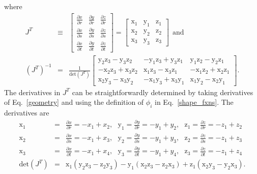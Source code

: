 %
where
%
\begin{eqnarray}
J^T &\equiv&
% 
\begin{bmatrix}
\frac{\partial x}{\partial r} & \frac{\partial y}{\partial r} & \frac{\partial z}{\partial r} \\
\frac{\partial x}{\partial s} & \frac{\partial y}{\partial s} & \frac{\partial z}{\partial s} \\
\frac{\partial x}{\partial t} & \frac{\partial y}{\partial t} & \frac{\partial z}{\partial t} 
\end{bmatrix} 
%
=
%
\begin{bmatrix}
\text{x}_1 & \text{y}_1 & \text{z}_1 \\
\text{x}_2 & \text{y}_2 & \text{z}_2 \\
\text{x}_3 & \text{y}_3 & \text{z}_3
\end{bmatrix} \ \ \text{and} \nonumber\\
%
(J^T)^{-1} &=& \frac{1}{\text{det}(J^T)} \begin{bmatrix}
\text{y}_2 \text{z}_3 - \text{y}_3 \text{z}_2 &-\text{y}_1 \text{z}_3 + \text{y}_3 \text{z}_1  & \text{y}_1 \text{z}_2 - \text{y}_2 \text{z}_1 \\
- \text{x}_2 \text{z}_3 + \text{x}_3\text{z}_2 & \text{x}_1\text{z}_3 - \text{x}_3 \text{z}_1 & -\text{x}_1 \text{z}_2 + \text{x}_2 \text{z}_1  \\
\text{x}_2 \text{y}_3 - \text{x}_3 \text{y}_2 & -\text{x}_1 \text{y}_3 + \text{x}_3 \text{y}_1 & \text{x}_1 \text{y}_2 - \text{x}_2 \text{y}_1
\end{bmatrix}.
\label{J}
\end{eqnarray}
%
The derivatives in $J^T$ can be straightforwardly determined by taking derivatives of Eq.\ \eqref{geometry} and using the definition of $\phi_i$ in Eq.\ \eqref{shape_fxns}. The derivatives are
%
\begin{eqnarray}
\text{x}_1 &=& \frac{\partial x}{\partial r} = -x_1 + x_2 , \ \ \
\text{y}_1 = \frac{\partial y}{\partial r} = -y_1 + y_2 , \ \ \
\text{z}_1 = \frac{\partial z}{\partial r} = -z_1 + z_2 \nonumber\\
%
\text{x}_2 &=& \frac{\partial x}{\partial s} = -x_1 + x_3 , \ \ \
\text{y}_2 = \frac{\partial y}{\partial s} = -y_1 + y_3, \ \ \  
\text{z}_2 = \frac{\partial z}{\partial s} = -z_1 + z_3 \nonumber\\
%
\text{x}_3 &=& \frac{\partial x}{\partial t} = - x_1 + x_4, \ \ \ 
\text{y}_3 = \frac{\partial y}{\partial t} = - y_1 + y_4, \ \ \ 
\text{z}_3 = \frac{\partial z}{\partial t} = -z_1 + z_4  \nonumber\\
%
\text{det}(J^T) &=& \text{x}_1 \left(\text{y}_2 \text{z}_3 - \text{z}_2\text{y}_3 \right) - \text{y}_1 \left(\text{x}_2 \text{z}_3 - \text{z}_2\text{x}_3 \right) + \text{z}_1 \left(\text{x}_2 \text{y}_3 - \text{y}_2\text{x}_3 \right).
\end{eqnarray}
%

